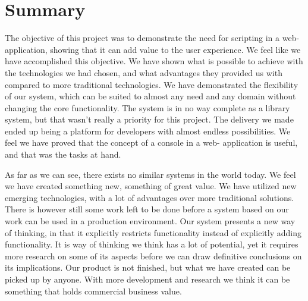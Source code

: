 \section{Summary}
The objective of this project was to demonstrate the need for scripting in a web- application, showing that it can add value to the user experience. We feel like we have accomplished this objective. We have shown what is possible to achieve with the technologies we had chosen, and what advantages they provided us with compared to more traditional technologies. We have demonstrated the flexibility of our system, which can be suited to almost any need and any domain without changing the core functionality. The system is in no way complete as a library system, but that wasn’t really a priority for this project. The delivery we made ended up being a platform for developers with almost endless possibilities. We feel we have proved that the concept of a console in a web- application is useful, and that was the tasks at hand.

As far as we can see, there exists no similar systems in the world today. We feel we have created something new, something of great value. We have utilized new emerging technologies, with a lot of advantages over more traditional solutions. There is however still some work left to be done before a system based on our work can be used in a production environment. Our system presents a new way of thinking, in that it explicitly restricts functionality instead of explicitly adding functionality. It is way of thinking we think has a lot of potential, yet it requires more research on some of its aspects before we can draw definitive conclusions on its implications. Our product is not finished, but what we have created can be picked up by anyone. With more development and research we think it can be something that holds commercial business value.


